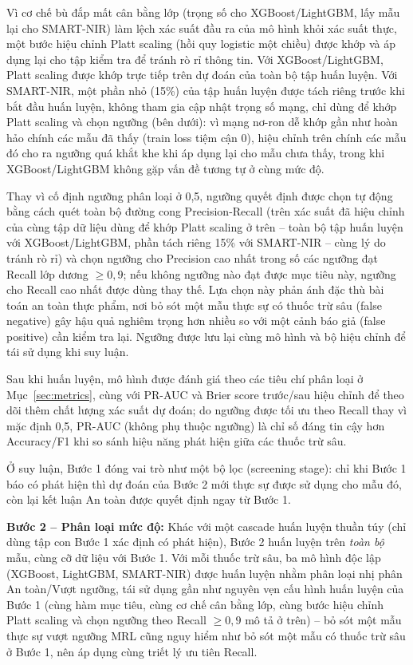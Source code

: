 \documentclass[10pt,twocolumn,twoside]{article}
\begin{document}
Vì cơ chế bù đắp mất cân bằng lớp (trọng số cho XGBoost/LightGBM, lấy mẫu
lại cho SMART-NIR) làm lệch xác suất đầu ra của mô hình khỏi xác
suất thực, một bước hiệu chỉnh Platt scaling (hồi quy logistic một chiều)
được khớp và áp dụng lại cho tập kiểm tra để tránh rò rỉ thông tin. Với
XGBoost/LightGBM, Platt scaling được khớp trực tiếp trên dự đoán của toàn bộ
tập huấn luyện. Với SMART-NIR, một phần nhỏ (15\%) của tập huấn
luyện được tách riêng trước khi bắt đầu huấn luyện, không tham gia cập nhật
trọng số mạng, chỉ dùng để khớp Platt scaling và chọn ngưỡng (bên dưới): vì
mạng nơ-ron dễ khớp gần như hoàn hảo chính các mẫu đã thấy (train loss tiệm
cận 0), hiệu chỉnh trên chính các mẫu đó cho ra ngưỡng quá khắt khe khi áp
dụng lại cho mẫu chưa thấy, trong khi XGBoost/LightGBM không gặp vấn đề
tương tự ở cùng mức độ.

Thay vì cố định ngưỡng phân loại ở 0,5, ngưỡng quyết định được chọn tự động
bằng cách quét toàn bộ đường cong Precision-Recall (trên xác suất đã hiệu
chỉnh của cùng tập dữ liệu dùng để khớp Platt scaling ở trên -- toàn bộ tập
huấn luyện với XGBoost/LightGBM, phần tách riêng 15\% với SMART-NIR
-- cùng lý do tránh rò rỉ) và chọn ngưỡng cho Precision cao nhất trong số các
ngưỡng đạt
Recall lớp dương $\geq 0{,}9$; nếu không ngưỡng nào đạt được mục tiêu này,
ngưỡng cho Recall cao nhất được dùng thay thế. Lựa chọn này phản ánh đặc thù
bài toán an toàn thực phẩm, nơi bỏ sót một mẫu thực sự có thuốc trừ sâu
(false negative) gây hậu quả nghiêm trọng hơn nhiều so với một cảnh báo giả
(false positive) cần kiểm tra lại. Ngưỡng được lưu lại cùng mô hình và bộ
hiệu chỉnh để tái sử dụng khi suy luận.

Sau khi huấn luyện, mô hình được đánh giá theo các tiêu chí phân loại ở
Mục~\ref{sec:metrics}, cùng với PR-AUC và Brier score trước/sau hiệu chỉnh
để theo dõi thêm chất lượng xác suất dự đoán; do ngưỡng được tối ưu theo
Recall thay vì mặc định 0,5, PR-AUC (không phụ thuộc ngưỡng) là chỉ số đáng
tin cậy hơn Accuracy/F1 khi so sánh hiệu năng phát hiện giữa các thuốc trừ
sâu.

Ở suy luận, Bước 1 đóng vai trò như một bộ lọc (screening stage): chỉ khi
Bước 1 báo có phát hiện thì dự đoán của Bước 2 mới thực sự được sử dụng cho
mẫu đó, còn lại kết luận An toàn được quyết định ngay từ Bước 1.

\textbf{Bước 2 -- Phân loại mức độ:} Khác với một cascade huấn luyện thuần
túy (chỉ dùng tập con Bước 1 xác định có phát hiện), Bước 2 huấn luyện trên
\emph{toàn bộ} mẫu, cùng cỡ dữ liệu với Bước 1. Với mỗi thuốc trừ sâu, ba
mô hình độc lập (XGBoost, LightGBM, SMART-NIR) được huấn luyện
nhằm phân loại nhị phân An toàn/Vượt ngưỡng, tái sử dụng gần như nguyên vẹn
cấu hình huấn luyện của Bước 1 (cùng hàm mục tiêu, cùng cơ chế cân bằng lớp,
cùng bước hiệu chỉnh Platt scaling và chọn ngưỡng theo Recall $\geq 0{,}9$
mô tả ở trên) -- bỏ sót một mẫu thực sự vượt ngưỡng MRL cũng nguy hiểm như
bỏ sót một mẫu có thuốc trừ sâu ở Bước 1, nên áp dụng cùng triết lý ưu tiên
Recall.
\end{document}
